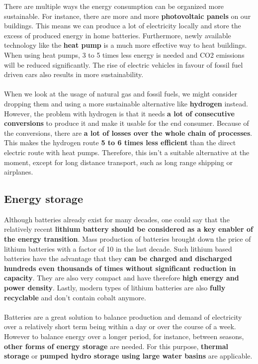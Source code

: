 \documentclass[../summary.tex]{subfiles}
\begin{document}
	There are multiple ways the energy consumption can be organized more sustainable. For instance, there are more and more \textbf{photovoltaic panels} on our buildings. This means we can produce a lot of electricity locally and store the excess of produced energy in home batteries. Furthermore, newly available technology like the \textbf{heat pump} is a much more effective way to heat buildings. When using heat pumps, 3 to 5 times less energy is needed and CO2 emissions will be reduced significantly. The rise of electric vehicles in favour of fossil fuel driven cars also results in more sustainability.
	\\\\
	When we look at the usage of natural gas and fossil fuels, we might consider dropping them and using a more sustainable alternative like \textbf{hydrogen} instead. However, the problem with  hydrogen is that it needs \textbf{a lot of consecutive conversions} to produce it and make it usable for the end consumer. Because of the conversions, there are \textbf{a lot of losses over the whole chain of processes}. This makes the hydrogen route \textbf{5 to 6 times less efficient} than the direct electric route with heat pumps. Therefore, this isn't a suitable alternative at the moment, except for long distance transport, such as long range shipping or airplanes.
	
	\subsection{Energy storage}
	
	Although batteries already exist for many decades, one could say that the relatively recent \textbf{lithium battery should be considered as a key enabler of the energy transition}. Mass production of batteries brought down the price of lithium batteries with a factor of 10 in the last decade. Such lithium based batteries have the advantage that they \textbf{can be charged and discharged hundreds even thousands of times without significant reduction in capacity}. They are also very compact and have therefore \textbf{high energy and power density}. Lastly, modern types of lithium batteries are also \textbf{fully recyclable} and don't contain cobalt anymore. 
	\\\\
	Batteries are a great solution to balance production and demand of electricity over a relatively short term being within a day or over the course of a week. However to balance energy over a longer period, for instance, between seasons, \textbf{other forms of energy storage} are needed. For this purpose, \textbf{thermal storage} or \textbf{pumped hydro storage using large water basins} are applicable. 
	
\end{document}
